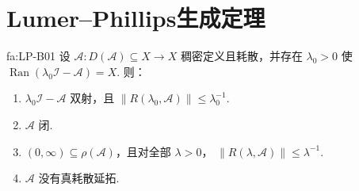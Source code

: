 \section{Lumer--Phillips生成定理}\label{sec:ii09-lumer-phillips}

\begin{FAProposition}[B][单点值域条件的传播与极大性]{fa:LP-B01}
设 \(\displaystyle \mathcal A:D(\mathcal A)\subseteq X\to X\)
稠密定义且耗散，并存在 \(\displaystyle\lambda_0>0\) 使 \(\displaystyle \operatorname{Ran}(\lambda_0\mathcal I-\mathcal A)=X.\)
则：
\begin{enumerate}[label=\textnormal{(\roman*)}]
\item \(\displaystyle\lambda_0\mathcal I-\mathcal A\) 双射，且 \(\displaystyle \|R(\lambda_0,\mathcal A)\| \leqslant \lambda_0^{-1}.\)
\item \(\displaystyle\mathcal A\) 闭.
\item \(\displaystyle(0,\infty)\subseteq\rho(\mathcal A)\)，且对全部 \(\displaystyle\lambda>0\)， \(\displaystyle \|R(\lambda,\mathcal A)\| \leqslant \lambda^{-1}.\)
\item \(\displaystyle\mathcal A\) 没有真耗散延拓.
\end{enumerate}
\end{FAProposition}

